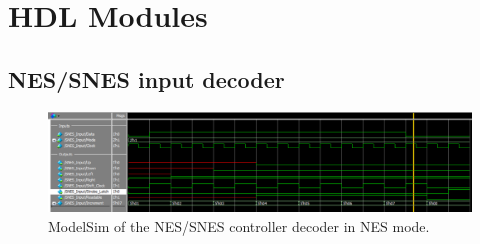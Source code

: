 \documentclass[]{article}
\begin{document}
\section{HDL Modules}
\subsection{NES/SNES input decoder}
\begin{figure}[H]\centering
	\includegraphics[width=\linewidth]{NES_Input_Sim.png}
	\caption{ModelSim of the NES/SNES controller decoder in NES mode.}
\end{figure}
\end{document}
